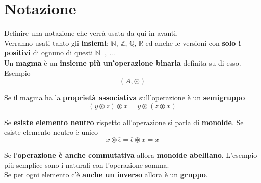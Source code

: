 \documentclass[11pt]{article}
\begin{document}
	\initcurrdate
	\maketitle 									%
	\newcommand{\nn}{\hfill \\}
	\newcommand{\NP}{\mathcal{NP}}
	
	\tableofcontents
	
	\newpage
	
	\section{Notazione}
	
	Definire una notazione che verrà usata da qui in avanti. \\
	
	Verranno usati tanto gli \textbf{insiemi}: $\mathbb{N}$, $\mathbb{Z}$, $\mathbb{Q}$, $\mathbb{R}$ ed anche le versioni con \textbf{solo i positivi} di ognuno di questi $\mathbb{N}^+$, ... \\
	
	Un \textbf{magma} è un \textbf{insieme più un'operazione binaria} definita su di esso. Esempio
	$$ (A, \circledast) $$
	
	Se il magma ha la \textbf{proprietà associativa} sull'operazione è un \textbf{semigruppo}
	$$ (y \circledast z) \circledast x = y \circledast (z \circledast x) $$
	
	Se \textbf{esiste elemento neutro} rispetto all'operazione si parla di \textbf{monoide}. Se esiste elemento neutro è unico
	$$ x \circledast \overline{\epsilon} = \overline{\epsilon} \circledast x = x $$
	
	Se l'\textbf{operazione è anche commutativa} allora \textbf{monoide abelliano}. L'esempio più semplice sono i naturali con l'operazione somma. \\
	
	Se per ogni elemento c'è \textbf{anche un inverso} allora è un \textbf{gruppo}. \\
	
\end{document}
